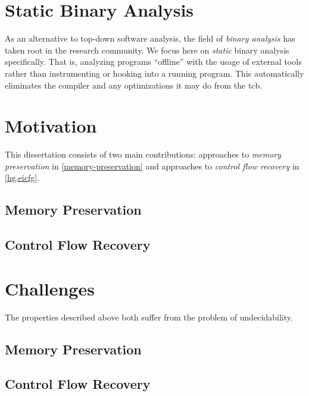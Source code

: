 \section{Static Binary Analysis}
As an alternative to top-down software analysis, the field of \emph{binary analysis} has taken root in the research community.
We focus here on \emph{static} binary analysis specifically.
That is, analyzing programs ``offline'' with the usage of external tools rather than instrumenting or hooking into a running program.
This automatically eliminates the compiler and any optimizations it may do from the \ac{tcb}.




\section{Motivation}


This dissertation consists of two main contributions: approaches to \emph{memory preservation} in \cref{memory-preservation} and approaches to \emph{control flow recovery} in \cref{hg,eicfg}.

\subsection{Memory Preservation}

\subsection{Control Flow Recovery}

\section{Challenges}
The properties described above both suffer from the problem of undecidability.

\subsection{Memory Preservation}

\subsection{Control Flow Recovery}

